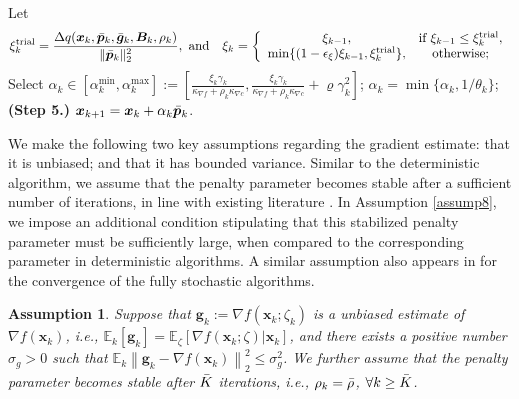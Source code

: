 \documentclass[aos]{imsart}
\numberwithin{equation}{section}
\theoremstyle{plain}
\newtheorem{assumption}{Assumption}
\begin{document}
\begin{algorithm}[htb]
\begin{algorithmic}[1]
  \STATE Let 
  \begin{equation}
  \label{strategy_xi}
   \xi_{k}^{\text{trial}} =  \frac{\Delta q(\bm{x}_k,\Bar{\bm{p}}_k, \Bar{\bm{g}}_k,\bm{B}_k,\rho_k)}{\|\Bar{\bm{p}}_k\|_2^2},
 ~  \text{and} \quad
      \xi_k = \left\{ \begin{array}{cc}
          \xi_{k-1}, & \text{if}~\xi_{k-1} \leq \xi_{k}^{\text{trial}},  \\
          \min\{(1-\epsilon_{\xi})\xi_{k-1},\xi_{k}^{\text{trial}}\},  & \text{otherwise;}
      \end{array} \right.
  \end{equation}
  \STATE Select $\alpha_k \in \left[\alpha_k^{\text{min}}, \alpha_k^{\max} \right] :=  \left[ \frac{ \xi_{k}\gamma_k}{\kappa_{\nabla f} + \rho_k \kappa_{\nabla c}} , \frac{ \xi_{k}\gamma_k}{\kappa_{\nabla f} + \rho_k \kappa_{\nabla c}} + \varrho \gamma_k^2 \right]$;
  \STATE $\alpha_k = \min\{\alpha_k,1/\theta_k\}$;
  \STATE \textbf{(Step 5.)} $\bm{x}_{k+1} = \bm{x}_{k} + \alpha_k \Bar{\bm{p}}_{k}$.
  \ENDFOR
 \end{algorithmic}
 \end{algorithm}
 
We make the following two key assumptions regarding the gradient estimate: that it is unbiased; and that it has bounded variance. 
Similar to the deterministic algorithm, we assume that the penalty parameter becomes stable after a sufficient number of iterations, in line with existing literature \cite{berahas2021sequential, qiu2023sequential}. In Assumption \ref{assump8}, we impose an additional condition stipulating that this stabilized penalty parameter must be sufficiently large, when compared to the corresponding parameter in deterministic algorithms. A similar assumption also appears in \cite{berahas2021sequential} for the convergence of the fully stochastic algorithms. 

\begin{assumption}
\label{assump3}
    Suppose that $\bm{g}_k:= \nabla f(\bm{x}_k;\zeta_k)$ is a unbiased estimate of $\nabla f(\bm{x}_k)$, i.e., $\mathbb{E}_k[\bm{g}_k] = \mathbb{E}_{\zeta}\left[ \nabla f(\bm{x}_k;\zeta)|\bm{x}_k\right] $, and there exists a positive number $\sigma_{g}>0$ such that $\mathbb{E}_{k}\left\|\bm{g}_k - \nabla f(\bm{x}_k)  \right\|_2^2 \leq \sigma_{g}^2$. We further assume that the penalty parameter becomes stable after $\Bar{K}$ iterations, i.e., $\rho_k = \Bar{\rho}$, $\forall k \geq \Bar{K}$. 
\end{assumption}
\end{document}
